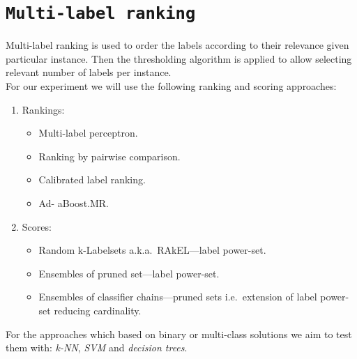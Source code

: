 \documentclass[12pt,a4paper,twocolumn]{article}
\begin{document}
\section*{\texttt{Multi-label ranking}}
Multi-label ranking is used to order the labels according to their relevance given particular instance. Then the thresholding algorithm is applied to allow selecting relevant number of labels per instance.\\
For our experiment we will use the following ranking and scoring approaches:
\begin{enumerate}
\item Rankings:
	\begin{itemize}
	\item Multi-label perceptron. %
	\item Ranking by pairwise comparison. %
	\item Calibrated label ranking. %
	\item Ad- aBoost.MR. %
	\end{itemize}
\item Scores:
	\begin{itemize}
	\item Random k-Labelsets a.k.a.\ RAkEL---label power-set. %
	\item Ensembles of pruned set---label power-set.
	\item Ensembles of classifier chains---pruned sets i.e.\ extension of label power-set reducing cardinality.
	\end{itemize}
\end{enumerate}

For the approaches which based on binary or multi-class solutions we aim to test them with: \emph{k-NN}, \emph{SVM} and \emph{decision trees}.
\end{document}
